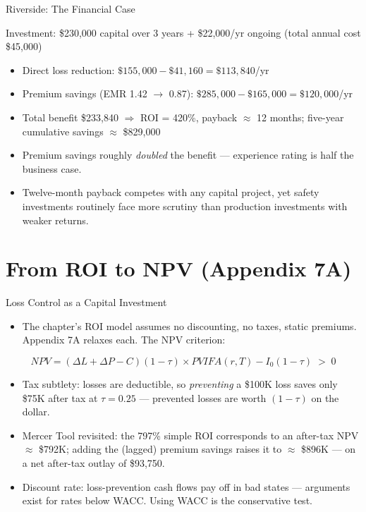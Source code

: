 \documentclass[11pt, aspectratio=169]{beamer}
\begin{document}
\begin{frame}{Riverside: The Financial Case}
\begin{exampleblock}{Investment: \$230{,}000 capital over 3 years + \$22{,}000/yr ongoing (total annual cost \$45{,}000)}
\begin{itemize}
  \item Direct loss reduction: $\$155{,}000 - \$41{,}160 = \$113{,}840$/yr
  \item Premium savings (EMR 1.42 $\rightarrow$ 0.87): $\$285{,}000 - \$165{,}000 = \$120{,}000$/yr
  \item Total benefit \$233{,}840 $\Rightarrow$ \alert{ROI = 420\%, payback $\approx$ 12 months}; five-year cumulative savings $\approx$ \$829{,}000
\end{itemize}
\end{exampleblock}
\medskip
\begin{itemize}
  \item Premium savings roughly \emph{doubled} the benefit --- experience rating is half the business case.
  \item Twelve-month payback competes with any capital project, yet safety investments routinely face more scrutiny than production investments with weaker returns.
\end{itemize}
\end{frame}

\section{From ROI to NPV (Appendix 7A)}

\begin{frame}{Loss Control as a Capital Investment}
\begin{itemize}
  \item The chapter's ROI model assumes no discounting, no taxes, static premiums. Appendix 7A relaxes each. The NPV criterion:
\end{itemize}
\[
NPV = (\Delta L + \Delta P - C)(1-\tau) \times PVIFA(r,T) - I_0(1-\tau) \;>\; 0
\]
\begin{itemize}
  \item Tax subtlety: losses are deductible, so \emph{preventing} a \$100K loss saves only \$75K after tax at $\tau = 0.25$ --- prevented losses are worth $(1-\tau)$ on the dollar.
  \item Mercer Tool revisited: the 797\% simple ROI corresponds to an after-tax NPV $\approx$ \$792K; adding the (lagged) premium savings raises it to $\approx$ \$896K --- on a net after-tax outlay of \$93{,}750.
  \item Discount rate: loss-prevention cash flows pay off in bad states --- arguments exist for rates below WACC. Using WACC is the conservative test.
\end{itemize}
\end{frame}
\end{document}
